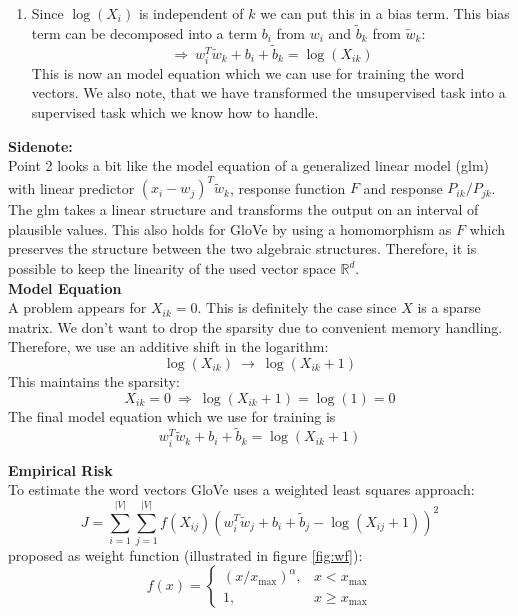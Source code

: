 \begin{enumerate}
\begin{enumerate}
        \item
          Since $\log(X_i)$ is independent of $k$ we can put this in a bias term. This
          bias term can be decomposed into a term $b_i$ from $w_i$ and 
          $\tilde{b}_k$ from $\tilde{w}_k$:
          \[
          \Rightarrow\ w_i^T\tilde{w}_k + b_i + \tilde{b}_k = \log(X_{ik})
          \]
          This is now an model equation which we can use for training the word vectors.
          We also note, that we have transformed the unsupervised task into a 
          supervised task which we know how to handle.
      \end{enumerate}
\end{enumerate}

\textbf{Sidenote:} \\

Point 2 looks a bit like the model equation of a generalized linear model (glm) 
with linear predictor $(x_i - w_j)^T\tilde{w}_k$, response function $F$ and response 
$P_{ik} / P_{jk}$. The glm takes a linear structure and transforms the output on an
interval of plausible values. This also holds for GloVe by using a homomorphism as $F$
which preserves the structure between the two algebraic structures. Therefore, it 
is possible to keep the linearity of the used vector space $\mathbb{R}^d$. \\

\textbf{Model Equation} \\

A problem appears for $X_{ik} = 0$. This is definitely the case since $X$ is 
a sparse matrix. We don't want to drop the sparsity due to convenient
memory handling. Therefore, we use an additive shift in the logarithm:
\[
\log(X_{ik})\ \rightarrow\ \log(X_{ik} + 1)
\]
This maintains the sparsity: 
\[
X_{ik} = 0\ \Rightarrow\ \log(X_{ik} + 1) = \log(1) = 0
\]
The final model equation which we use for training is
\[
w_i^T\tilde{w}_k + b_i + \tilde{b}_k = \log(X_{ik} + 1)
\]

\newpage

\textbf{Empirical Risk} \\

To estimate the word vectors GloVe uses a weighted least squares approach:
\[
J = \sum\limits_{i=1}^{|V|}\sum\limits_{j=1}^{|V|}f(X_{ij})\left(w_i^T\tilde{w}_j + b_i + \tilde{b}_j - \log(X_{ij} + 1)\right)^2
\]
\cite{pennington2014glove} proposed as weight function (illustrated in figure \ref{fig:wf}):
\[
f(x) = \left\{
\begin{array}{ccc}
(x / x_\mathrm{max})^\alpha, & x < x_\mathrm{max} \\
1, & x \geq x_\mathrm{max}
\end{array}
\right.
\]

